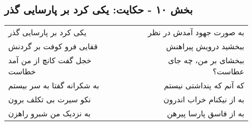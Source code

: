\begin{center}
\section*{بخش ۱۰ - حکایت: یکی کرد بر پارسایی گذر}
\label{sec:010}
\begin{longtable}{l p{0.5cm} r}
یکی کرد بر پارسایی گذر
&&
به صورت جهود آمدش در نظر
\\
قفایی فرو کوفت بر گردنش
&&
ببخشید درویش پیراهنش
\\
خجل گفت کانچ از من آمد خطاست
&&
ببخشای بر من، چه جای عطاست؟
\\
به شکرانه گفتا به سر بیستم
&&
که آنم که پنداشتی نیستم
\\
نکو سیرت بی تکلف برون
&&
به از نیکنام خراب اندرون
\\
به نزدیک من شبرو راهزن
&&
به از فاسق پارسا پیرهن
\\
\end{longtable}
\end{center}
